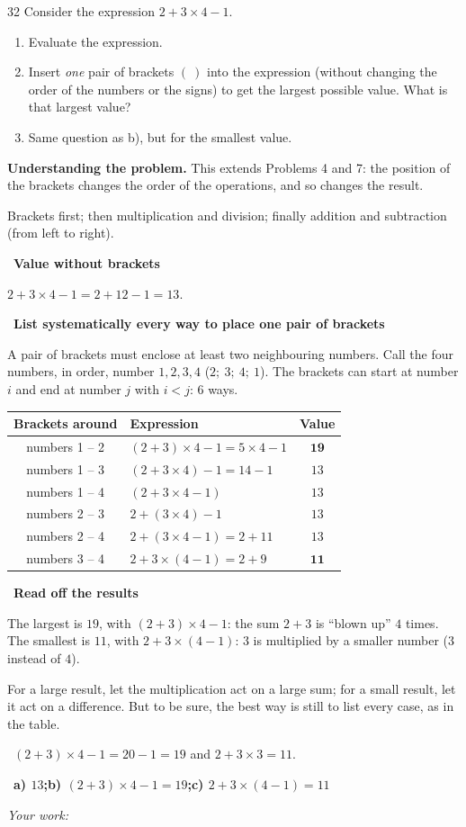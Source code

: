 \documentclass[11pt]{article}
\newif\ifsol \solfalse
\providecommand{\AnsWord}{Đáp số}
\newcommand{\ans}[1]{\par\smallskip{\bfseries\color{tmGreen!88!black}\AnsWord:}\ {\bfseries\color{AnsRed}#1}\par}
\newcommand{\probsol}[1]{%
  \begin{lrbox}{\solmeasure}\begin{minipage}{\dimexpr\linewidth-24pt\relax}#1\end{minipage}\end{lrbox}%
  \ifsol
    \begin{solbox}#1\end{solbox}%
  \else
    \setlength{\solht}{\dimexpr\ht\solmeasure+\dp\solmeasure+0.85cm\relax}%
    \ifdim\solht<1.35cm\setlength{\solht}{1.35cm}\fi
    \ifdim\solht>\StudentMaxWork\setlength{\solht}{\StudentMaxWork}\fi
    \begin{tcolorbox}[colback=white,colframe=Line,boxrule=0.8pt,arc=5pt,
      left=8pt,right=8pt,top=4pt,bottom=4pt,height=\solht]{\footnotesize\color{Slate}\itshape\WorkWord}\end{tcolorbox}%
  \fi}
\newlength{\StudentMaxWork}\setlength{\StudentMaxWork}{7.5cm}
\newcommand{\step}[2]{\par\smallskip\noindent{\bfseries\color{tmBlue!85!black}\StepWord~#1.}\ {\bfseries #2}\par\nopagebreak}
\newcommand{\verify}[1]{\par\smallskip\noindent{\bfseries\color{tmGreen!80!black}\faCheckCircle\ \CheckWord}\ #1\par}
\def\WorkWord{Your work:}
\def\AnsWord{Answer}
\def\StepWord{Step}
\def\CheckWord{Check:}
\begin{document}
\begin{probbox}{32}{\relax}
Consider the expression $2 + 3 \times 4 - 1$.
\begin{enumerate}[label=\alph*),leftmargin=1.6em,itemsep=0pt,topsep=2pt]
  \item Evaluate the expression.
  \item Insert \emph{one} pair of brackets $(\ )$ into the expression (without changing the order of the numbers or the signs)
  to get the largest possible value. What is that largest value?
  \item Same question as b), but for the smallest value.
\end{enumerate}
\end{probbox}
\probsol{
\textbf{Understanding the problem.} This extends Problems 4 and 7: the position of the brackets changes the order of the
operations, and so changes the result.
\begin{recallbox}Brackets first; then multiplication and division; finally addition and subtraction (from left to right).\end{recallbox}
\step{1}{Value without brackets}
$2 + 3\times 4 - 1 = 2 + 12 - 1 = 13$.
\step{2}{List systematically every way to place one pair of brackets}
A pair of brackets must enclose at least two neighbouring numbers. Call the four numbers, in order, number $1, 2, 3, 4$
($2;\ 3;\ 4;\ 1$). The brackets can start at number $i$ and end at number $j$ with $i < j$: $6$ ways.
\begin{center}
\begin{tabular}{|c|l|c|}
\hline
\rowcolor{tmBlue!10} Brackets around & Expression & Value\\ \hline
numbers 1 -- 2 & $(2+3)\times 4 - 1 = 5\times 4 - 1$ & $\mathbf{19}$\\ \hline
numbers 1 -- 3 & $(2+3\times 4) - 1 = 14 - 1$ & $13$\\ \hline
numbers 1 -- 4 & $(2+3\times 4-1)$ & $13$\\ \hline
numbers 2 -- 3 & $2 + (3\times 4) - 1$ & $13$\\ \hline
numbers 2 -- 4 & $2 + (3\times 4 - 1) = 2 + 11$ & $13$\\ \hline
numbers 3 -- 4 & $2 + 3\times(4 - 1) = 2 + 9$ & $\mathbf{11}$\\ \hline
\end{tabular}
\end{center}
\step{3}{Read off the results}
The largest is $19$, with $(2+3)\times 4 - 1$: the sum $2 + 3$ is ``blown up'' $4$ times.\\
The smallest is $11$, with $2 + 3\times(4-1)$: $3$ is multiplied by a smaller number ($3$ instead of $4$).
\begin{tipbox}For a large result, let the multiplication act on a large sum; for a small result, let it act on a difference.
But to be sure, the best way is still to list every case, as in the table.\end{tipbox}
\verify{$(2+3)\times 4 - 1 = 20 - 1 = 19$ and $2 + 3\times 3 = 11$.}
\ans{a) $13$;\quad b) $(2+3)\times 4 - 1 = 19$;\quad c) $2 + 3\times(4-1) = 11$}
}
\end{document}
